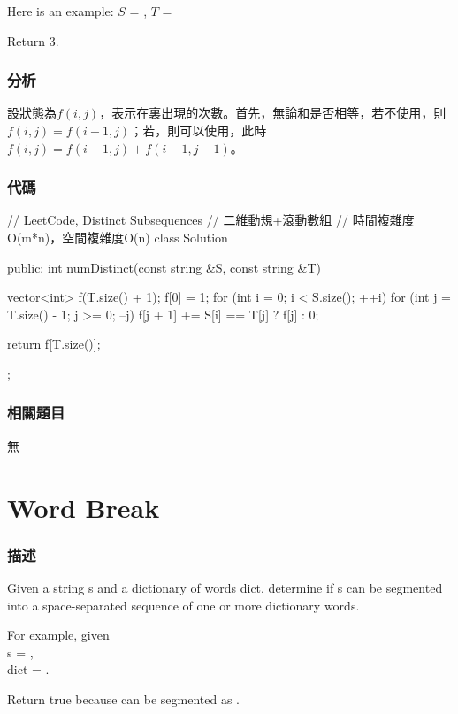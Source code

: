 Here is an example:
$S$ = , $T$ = 

Return 3.


\subsubsection{分析}
設狀態為$f(i,j)$，表示在裏出現的次數。首先，無論和是否相等，若不使用，則$f(i,j)=f(i-1,j)$；若，則可以使用，此時$f(i,j)=f(i-1,j)+f(i-1, j-1)$。


\subsubsection{代碼}
\begin{Code}
// LeetCode, Distinct Subsequences
// 二維動規+滾動數組
// 時間複雜度O(m*n)，空間複雜度O(n)
class Solution {
public:
    int numDistinct(const string &S, const string &T) {
        vector<int> f(T.size() + 1);
        f[0] = 1;
        for (int i = 0; i < S.size(); ++i) {
            for (int j = T.size() - 1; j >= 0; --j) {
                f[j + 1] += S[i] == T[j] ? f[j] : 0;
            }
        }

        return f[T.size()];
    }
};
\end{Code}


\subsubsection{相關題目}
\begindot
\item 無
\myenddot


\section{Word Break} %
\label{sec:word-break}


\subsubsection{描述}
Given a string s and a dictionary of words dict, determine if s can be segmented into a space-separated sequence of one or more dictionary words.

For example, given \\
s = ,\\
dict = .

Return true because  can be segmented as .


